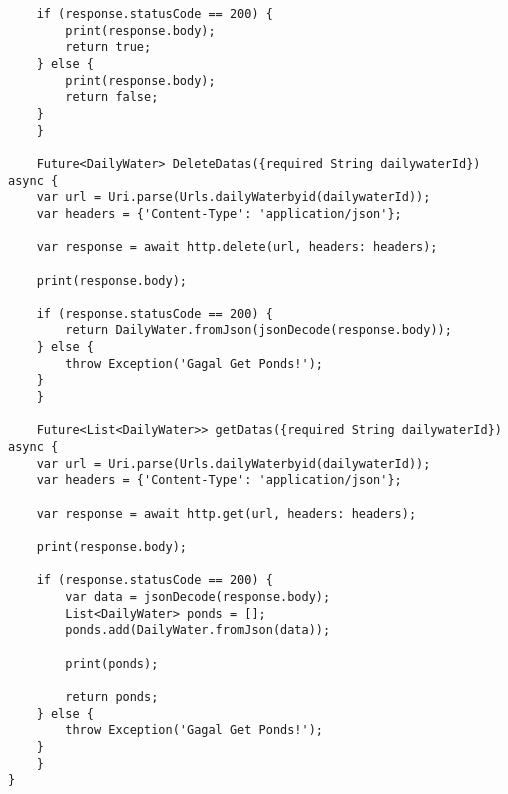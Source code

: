 \begin{lstlisting}
    if (response.statusCode == 200) {
        print(response.body);
        return true;
    } else {
        print(response.body);
        return false;
    }
    }

    Future<DailyWater> DeleteDatas({required String dailywaterId}) async {
    var url = Uri.parse(Urls.dailyWaterbyid(dailywaterId));
    var headers = {'Content-Type': 'application/json'};

    var response = await http.delete(url, headers: headers);

    print(response.body);

    if (response.statusCode == 200) {
        return DailyWater.fromJson(jsonDecode(response.body));
    } else {
        throw Exception('Gagal Get Ponds!');
    }
    }

    Future<List<DailyWater>> getDatas({required String dailywaterId}) async {
    var url = Uri.parse(Urls.dailyWaterbyid(dailywaterId));
    var headers = {'Content-Type': 'application/json'};

    var response = await http.get(url, headers: headers);

    print(response.body);

    if (response.statusCode == 200) {
        var data = jsonDecode(response.body);
        List<DailyWater> ponds = [];
        ponds.add(DailyWater.fromJson(data));

        print(ponds);

        return ponds;
    } else {
        throw Exception('Gagal Get Ponds!');
    }
    }
}        
	\end{lstlisting}

	\clearpage
